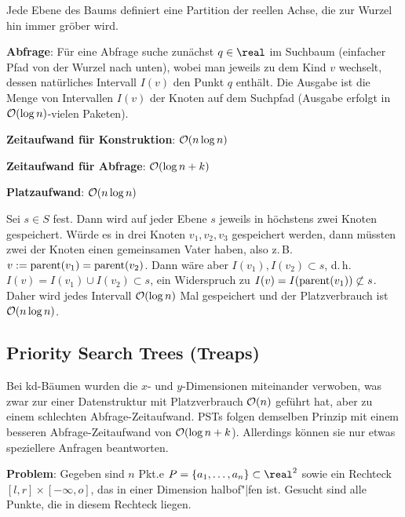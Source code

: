 Jede Ebene des Baums definiert eine Partition der reellen Achse, die zur Wurzel hin immer gröber
wird.

\linie

\textbf{Abfrage}:
Für eine Abfrage suche zunächst $q \in \real$ im Suchbaum
(einfacher Pfad von der Wurzel nach unten),
wobei man jeweils zu dem Kind $v$ wechselt, dessen natürliches Intervall $I(v)$ den Punkt $q$
enthält.
Die Ausgabe ist die Menge von Intervallen $I(v)$ der Knoten auf dem Suchpfad
(Ausgabe erfolgt in $\mathcal{O}(\log n)$-vielen Paketen).

\linie

\textbf{Zeitaufwand für Konstruktion}:
$\mathcal{O}(n \log n)$

\textbf{Zeitaufwand für Abfrage}:
$\mathcal{O}(\log n + k)$

\textbf{Platzaufwand}:
$\mathcal{O}(n \log n)$

\begin{Beweis}
    Sei $s \in S$ fest.
    Dann wird auf jeder Ebene $s$ jeweils in höchstens zwei Knoten gespeichert.
    Würde es in drei Knoten $v_1, v_2, v_3$ gespeichert werden, dann müssten zwei der Knoten
    einen gemeinsamen Vater haben, also z.\,B. $v := \operatorname{parent}(v_1) = \operatorname{parent}(v_2)$.
    Dann wäre aber $I(v_1), I(v_2) \subset s$, d.\,h.
    $I(v) = I(v_1) \cup I(v_2) \subset s$,
    ein Widerspruch zu $I(v) = I(\operatorname{parent}(v_1)) \not\subset s$.
    Daher wird jedes Intervall $\mathcal{O}(\log n)$ Mal gespeichert und der Platzverbrauch ist
    $\mathcal{O}(n \log n)$.
\end{Beweis}

\pagebreak

\subsection{%
    Priority Search Trees (Treaps)%
}

Bei kd-Bäumen wurden die $x$- und $y$-Dimensionen miteinander verwoben,
was zwar zur einer Datenstruktur mit Platzverbrauch $\mathcal{O}(n)$ geführt hat,
aber zu einem schlechten Abfrage-Zeitaufwand.
PSTs folgen demselben Prinzip mit einem besseren Abfrage-Zeitaufwand von $\mathcal{O}(\log n + k$).
Allerdings können sie nur etwas speziellere Anfragen beantworten.

\textbf{Problem}:
Gegeben sind $n$ Pkt.e $P = \{a_1, \dotsc, a_n\} \subset \real^2$ sowie ein
Rechteck $[l, r] \times [-\infty, o]$, das in einer Dimension halbof"|fen ist.
Gesucht sind alle Punkte, die in diesem Rechteck liegen.

